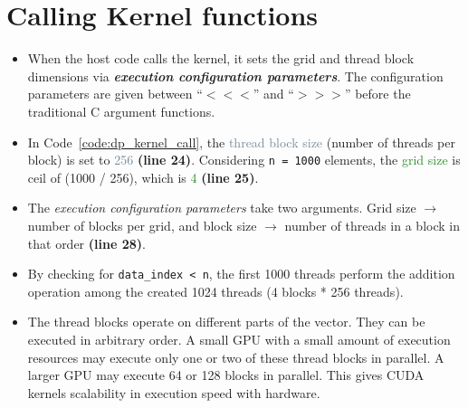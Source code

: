 \section{Calling Kernel functions}
\begin{itemize}
    \item When the host code calls the kernel, it sets the grid and thread block dimensions via \textbf{\textit{execution configuration parameters}}. The configuration parameters are given between \enquote{$<<<$} and \enquote{$>>>$} before the traditional C argument functions.
    \item In Code~\ref{code:dp_kernel_call}, the \textcolor{LightSlateGrey}{thread block size} (number of threads per block) is set to \textcolor{LightSlateGrey}{256} \textbf{(line 24)}. Considering \texttt{n = 1000} elements, the  \textcolor{ForestGreen}{grid size} is ceil of (1000 / 256), which is \textcolor{ForestGreen}{4} \textbf{(line 25)}.
    \item The \textit{execution configuration parameters} take two arguments. Grid size $\rightarrow $ number of blocks per grid, and block size $\rightarrow$ number of threads in a block in that order \textbf{(line 28)}.
    \item By checking for \texttt{data\_index < n}, the first 1000 threads perform the addition operation among the created 1024 threads (4 blocks * 256 threads).
    \item The thread blocks operate on different parts of the vector. They can be executed in arbitrary order. A small GPU with a small amount of execution resources may execute only one or two of these thread blocks in parallel. A larger GPU may execute 64 or 128 blocks in parallel. This gives CUDA kernels scalability in  execution speed with hardware.\pagebreak
\end{itemize}
